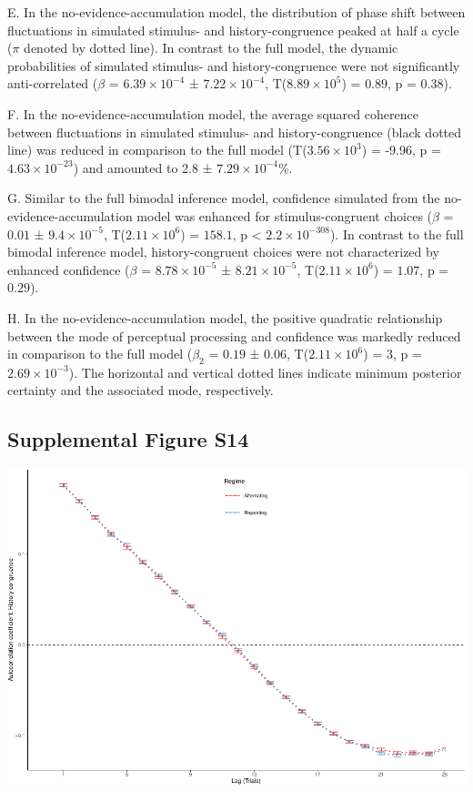 \documentclass[
]{article}
\begin{document}
E. In the no-evidence-accumulation model, the distribution of phase
shift between fluctuations in simulated stimulus- and history-congruence
peaked at half a cycle (\(\pi\) denoted by dotted line). In contrast to
the full model, the dynamic probabilities of simulated stimulus- and
history-congruence were not significantly anti-correlated (\(\beta\) =
\(\ensuremath{6.39\times 10^{-4}}\) ±
\(\ensuremath{7.22\times 10^{-4}}\),
T(\(\ensuremath{8.89\times 10^{5}}\)) = \(0.89\), p = \(0.38\)).

F. In the no-evidence-accumulation model, the average squared coherence
between fluctuations in simulated stimulus- and history-congruence
(black dotted line) was reduced in comparison to the full model
(T(\ensuremath{3.56\times 10^{3}}) = -9.96, p =
\(\ensuremath{4.63\times 10^{-23}}\)) and amounted to 2.8 ±
\ensuremath{7.29\times 10^{-4}}\%.

G. Similar to the full bimodal inference model, confidence simulated
from the no-evidence-accumulation model was enhanced for
stimulus-congruent choices (\(\beta\) = \(0.01\) ±
\(\ensuremath{9.4\times 10^{-5}}\),
T(\(\ensuremath{2.11\times 10^{6}}\)) = \(158.1\), p < \(\ensuremath{2.2\times 10^{-308}}\)). In
contrast to the full bimodal inference model, history-congruent choices
were not characterized by enhanced confidence (\(\beta\) =
\(\ensuremath{8.78\times 10^{-5}}\) ±
\(\ensuremath{8.21\times 10^{-5}}\),
T(\(\ensuremath{2.11\times 10^{6}}\)) = \(1.07\), p = \(0.29\)).

H. In the no-evidence-accumulation model, the positive quadratic
relationship between the mode of perceptual processing and confidence
was markedly reduced in comparison to the full model (\(\beta_2\) =
\(0.19\) ± \(0.06\), T(\(\ensuremath{2.11\times 10^{6}}\)) = \(3\), p =
\(\ensuremath{2.69\times 10^{-3}}\)). The horizontal and vertical dotted
lines indicate minimum posterior certainty and the associated mode,
respectively.

\newpage

\hypertarget{supplemental-figure-s14}{%
\subsection{Supplemental Figure S14}\label{supplemental-figure-s14}}

\includegraphics{modes_mouse_rev1b_clean_files/figure-latex/Supplemental_Figure_S14-1.pdf}
\end{document}
